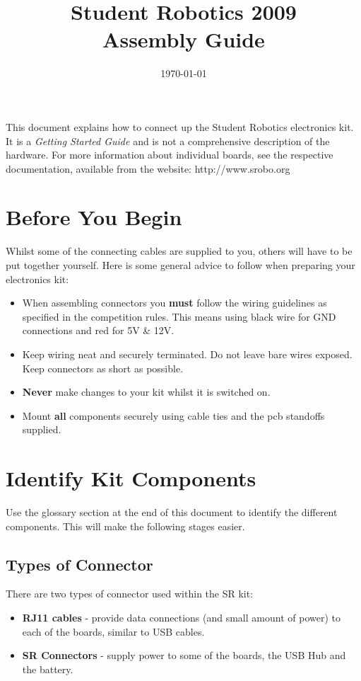 \documentclass[a4paper, 12pt]{article}
\title {Student Robotics 2009\\ Assembly Guide}
\date{\today}
\begin{document}
\maketitle

\noindent This document explains how to connect up the Student Robotics electronics kit. It is a \textit{Getting Started Guide} and is not a comprehensive description of the hardware. For more information about individual boards, see the respective documentation, available from the website: http://www.srobo.org 

\section{Before You Begin}

Whilst some of the connecting cables are supplied to you, others will have to be put together yourself. Here is some general advice to follow when preparing your electronics kit:
\begin{itemize}
\item When assembling connectors you \textbf{must} follow the wiring guidelines as specified in the competition rules. This means using black wire for GND connections and red for 5V \& 12V. 
\item Keep wiring neat and securely terminated. Do not leave bare wires exposed. Keep connectors as short as possible.
\item \textbf{Never} make changes to your kit whilst it is switched on.
\item Mount \textbf{all} components securely using cable ties and the pcb standoffs supplied.

\end{itemize}


\section{Identify Kit Components}
Use the glossary section at the end of this document to identify the different components. This will make the following stages easier.
\subsection{Types of Connector}
There are two types of connector used within the SR kit: 
\begin{itemize}
\item \textbf{RJ11 cables} - provide data connections (and small amount of power) to each of the boards, similar to USB cables. 
\item \textbf{SR Connectors} - supply power to some of the boards, the USB Hub and the battery.
\end{itemize} 
\end{document}
